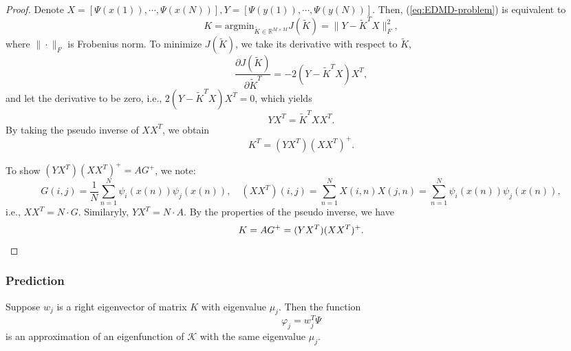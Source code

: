 \begin{proof}
  Denote $X = [\Psi(x(1)),\cdots,\Psi(x(N))], Y =
  [\Psi(y(1)),\cdots,\Psi(y(N))]$.
  Then, (\ref{eq:EDMD-problem}) is equivalent to
  \begin{equation*}
    K = \text{argmin}_{\tilde{K} \in \mathbb{R}^{M \times M}} J(\tilde{K})
    = \|Y - \tilde{K}^TX\|_F^2,
  \end{equation*}
  where $\|\cdot\|_F$ is Frobenius norm.
  To minimize $J(\tilde{K})$, we take its derivative with respect to $\tilde{K}$,
  \begin{equation*}
    \frac{\partial J(\tilde{K})}{\partial \tilde{K}^T}
    = - 2(Y - \tilde{K}^TX)X^T,
  \end{equation*}
  and let the derivative to be zero, i.e.,
  $2(Y-\tilde{K}^TX)X^T = 0$,
  which yields
  \begin{equation*}
    YX^T = \tilde{K}^TXX^T.
  \end{equation*}
  By taking the pseudo inverse of $XX^T$,
  we obtain
  \begin{equation*}
    K^T = (YX^T)(XX^T)^+.
  \end{equation*}

  To show $(YX^T)(XX^T)^+ = AG^+$,
  we note:
  \begin{equation*}
    G(i,j) = \frac{1}{N} \sum\limits_{n = 1}^N \psi_i(x(n))\psi_j(x(n)), \quad
    (XX^T)(i,j) = \sum\limits_{n = 1}^N X(i,n)X(j,n) = \sum\limits_{n = 1}^N \psi_i(x(n))\psi_j(x(n)),
  \end{equation*}
  i.e., $XX^T = N \cdot G$.
  Similaryly, $YX^T = N \cdot A$.
  By the properties of the pseudo inverse,
  we have
  \begin{equation*}
    K = AG^+ = (YX^T)(XX^T)^+. \qedhere
  \end{equation*}
\end{proof}

\subsubsection{Prediction}


\begin{proposition}
  Suppose $w_j$ is a right eigenvector of matrix $K$ with eigenvalue $\mu_j$.
  Then the function
  \begin{equation}
    \label{eq:expression-of-eigenfunction}
    \varphi_j = w_j^T \Psi
  \end{equation}
  is an approximation of an eigenfunction of $\mathcal{K}$
  with the same eigenvalue $\mu_j$.
\end{proposition}

